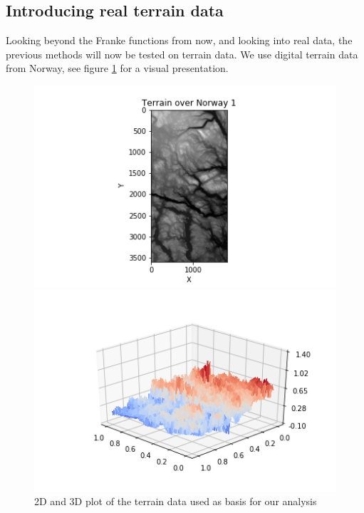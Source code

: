 \documentclass{article}
\begin{document}
\clearpage
\subsection{Introducing real terrain data}
Looking beyond the Franke functions from now, and looking into real data, the previous methods will now be tested on terrain data. We use digital terrain data from Norway, see figure \ref{terraindata} for a visual presentation. 
\begin{figure}[h]
\begin{minipage}{0.48\textwidth}
\centering
\includegraphics[width=1.5\linewidth]{terrain2dplot.png}
\end{minipage}
\begin{minipage}{\textwidth}

\includegraphics[width=0.7\linewidth]{rawdataplot.png}
\end{minipage}
\caption{2D and 3D plot of the terrain data used as basis for our analysis}
\label{terraindata}
\end{figure}

\clearpage
\end{document}
